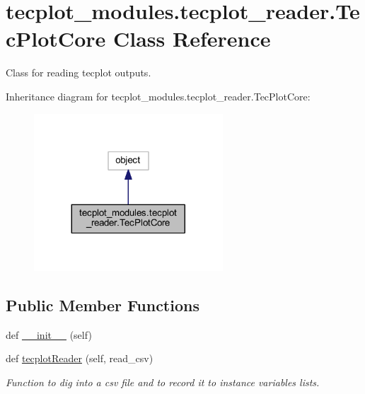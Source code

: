 \hypertarget{a00118}{}\section{tecplot\+\_\+modules.\+tecplot\+\_\+reader.\+Tec\+Plot\+Core Class Reference}
\label{a00118}


Class for reading tecplot outputs.  




Inheritance diagram for tecplot\+\_\+modules.\+tecplot\+\_\+reader.\+Tec\+Plot\+Core\+:\nopagebreak
\begin{figure}[H]
\begin{center}
\leavevmode
\includegraphics[width=200pt]{a00117}
\end{center}
\end{figure}
\subsection*{Public Member Functions}
\begin{DoxyCompactItemize}
\item 
def \hyperlink{a00118_a15954180c0b4a9677efd980873a91773}{\+\_\+\+\_\+init\+\_\+\+\_\+} (self)
\item 
def \hyperlink{a00118_a9cf438934b57cd1d0bef90bcc00f27ac}{tecplot\+Reader} (self, read\+\_\+csv)
\begin{DoxyCompactList}\small\item\em Function to dig into a csv file and to record it to instance variables lists. \end{DoxyCompactList}\end{DoxyCompactItemize}

